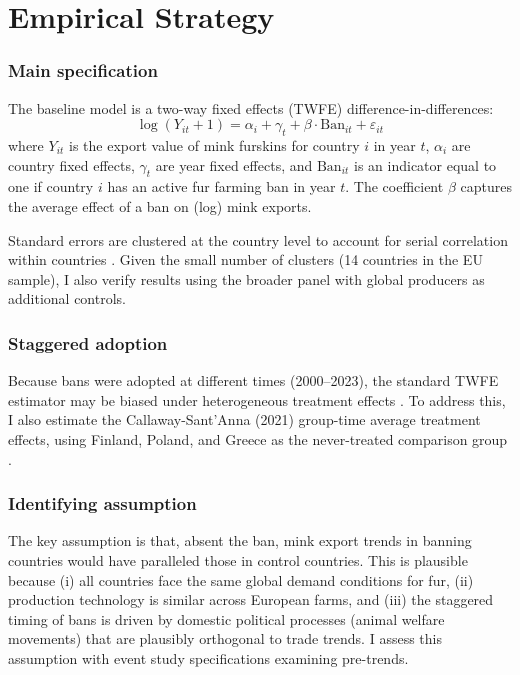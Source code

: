 \documentclass[12pt]{article}
\begin{document}



\section{Empirical Strategy}\label{sec:methods}

\subsubsection*{Main specification} The baseline model is a two-way fixed effects (TWFE) difference-in-differences:
\begin{equation}\label{eq:twfe}
    \log(Y_{it} + 1) = \alpha_i + \gamma_t + \beta \cdot \text{Ban}_{it} + \varepsilon_{it}
\end{equation}
where $Y_{it}$ is the export value of mink furskins for country $i$ in year $t$, $\alpha_i$ are country fixed effects, $\gamma_t$ are year fixed effects, and $\text{Ban}_{it}$ is an indicator equal to one if country $i$ has an active fur farming ban in year $t$. The coefficient $\beta$ captures the average effect of a ban on (log) mink exports.

Standard errors are clustered at the country level to account for serial correlation within countries \citep{bertrand2004much}. Given the small number of clusters (14 countries in the EU sample), I also verify results using the broader panel with global producers as additional controls.

\subsubsection*{Staggered adoption} Because bans were adopted at different times (2000--2023), the standard TWFE estimator may be biased under heterogeneous treatment effects \citep{dechaisemartin2020two, goodman2021difference}. To address this, I also estimate the Callaway-Sant'Anna (2021) group-time average treatment effects, using Finland, Poland, and Greece as the never-treated comparison group \citep{callaway2021difference}.

\subsubsection*{Identifying assumption} The key assumption is that, absent the ban, mink export trends in banning countries would have paralleled those in control countries. This is plausible because (i) all countries face the same global demand conditions for fur, (ii) production technology is similar across European farms, and (iii) the staggered timing of bans is driven by domestic political processes (animal welfare movements) that are plausibly orthogonal to trade trends. I assess this assumption with event study specifications examining pre-trends.
\end{document}

